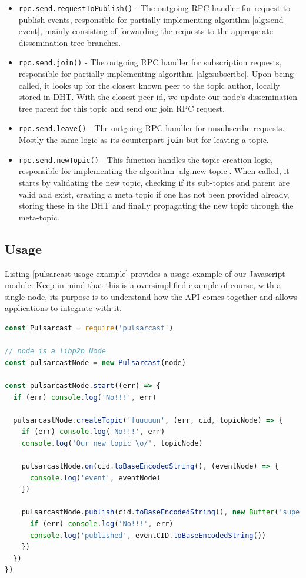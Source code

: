 \begin{itemize}
  \item
    \verb|rpc.send.requestToPublish()| - The outgoing RPC handler for request to publish events, responsible for partially implementing algorithm \ref{alg:send-event}, mainly consisting of forwarding the requests to the appropriate dissemination tree branches.
  \item
    \verb|rpc.send.join()| - The outgoing RPC handler for subscription requests, responsible for partially implementing algorithm \ref{alg:subscribe}. Upon being called, it looks up for the closest known peer to the topic author, locally stored in DHT. With the closest peer id, we update our node's dissemination tree parent for this topic and send our join RPC request.
  \item
    \verb|rpc.send.leave()| - The outgoing RPC handler for unsubscribe requests. Mostly the same logic as its counterpart \verb|join| but for leaving a topic.
  \item
    \verb|rpc.send.newTopic()| - This function handles the topic creation logic, responsible for implementing the algorithm \ref{alg:new-topic}.  When called, it starts by validating the new topic, checking if its sub-topics and parent are valid and exist, creating a meta topic if one has not been provided already, storing these in the DHT and finally propagating the new topic through the meta-topic.
\end{itemize}

\subsection{Usage}\label{subsec:usage}

Listing \ref{pulsarcast-usage-example} provides a usage example of our
Javascript module. Keep in mind that this is a oversimplified example of
course, with a single node, its purpose is to understand how the API comes
together and allows applications to integrate with it.

\begin{lstlisting}[language=JavaScript, float=h, caption={Usage example of our Pulsarcast module},label={pulsarcast-usage-example}]
const Pulsarcast = require('pulsarcast')

// node is a libp2p Node
const pulsarcastNode = new Pulsarcast(node)

const pulsarcastNode.start((err) => {
  if (err) console.log('No!!!', err)
  
  pulsarcastNode.createTopic('fuuuuun', (err, cid, topicNode) => {
    if (err) console.log('No!!!', err)
    console.log('Our new topic \o/', topicNode)
    
    pulsarcastNode.on(cid.toBaseEncodedString(), (eventNode) => {
      console.log('event', eventNode)
    })
    
    pulsarcastNode.publish(cid.toBaseEncodedString(), new Buffer('super fun!'), (err, eventCID) => {
      if (err) console.log('No!!!', err)
      console.log('published', eventCID.toBaseEncodedString())
    })
  })
})
\end{lstlisting}

